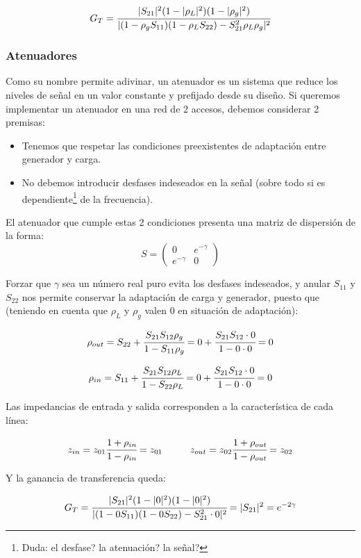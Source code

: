 \documentclass[12pt]{article}
\begin{document}
$$G_T = \cfrac{|S_{21}|^2 (1-|\rho_L|^2) (1-|\rho_g|^2)}{|(1-\rho_g S_{11})(1-\rho_L S_{22}) -S_{21}^2 \rho_L\rho_g|^2}$$

\subsubsection{Atenuadores}

Como su nombre permite adivinar, un atenuador es un sistema que reduce los niveles de se\~nal en un valor constante y prefijado desde su dise\~no. Si queremos implementar un atenuador en una red de 2 accesos, debemos considerar 2 premisas:
\begin{itemize}
	\item Tenemos que respetar las condiciones preexistentes de adaptaci\'on entre generador y carga.
	\item No debemos introducir desfases indeseados en la se\~nal (sobre todo si es dependiente\footnote{Duda: el desfase? la atenuaci\'on? la se\~nal?} de la frecuencia).
\end{itemize}

El atenuador que cumple estas 2 condiciones presenta una matriz de dispersi\'on de la forma:
$$S =\left(\begin{array}{cc}
	0 & e^{-\gamma}\\
	e^{-\gamma} & 0
\end{array}\right)$$

Forzar que $\gamma$ sea un n\'umero real puro evita los desfases indeseados, y anular $S_{11}$ y $S_{22}$ nos permite conservar la adaptaci\'on de carga y generador, puesto que (teniendo en cuenta que $\rho_L$ y $\rho_g$ valen 0 en situaci\'on de adaptaci\'on):

$$\rho_{out} = S_{22} + \cfrac{S_{21}S_{12}\rho_g}{1 - S_{11}\rho_g} = 0 + \cfrac{S_{21}S_{12}\cdot 0}{1 - 0\cdot0} = 0$$

$$\rho_{in} = S_{11} + \cfrac{S_{21}S_{12}\rho_L}{1 - S_{22}\rho_L} = 0 + \cfrac{S_{21}S_{12}\cdot 0}{1 - 0\cdot0} = 0$$

Las impedancias de entrada y salida corresponden a la caracter\'istica de cada l\'inea:

$$z_{in} = z_{01}\cfrac{1+\rho_{in}}{1-\rho_{in}} = z_{01} \hspace{1cm} z_{out} = z_{02}\cfrac{1+\rho_{out}}{1-\rho_{out}} = z_{02}$$

Y la ganancia de transferencia queda:

$$G_T = \cfrac{|S_{21}|^2 (1-|0|^2) (1-|0|^2)}{|(1-0 S_{11})(1-0 S_{22}) -S_{21}^2 \cdot 0|^2} = |S_{21}|^2 = e^{-2\gamma}$$
\end{document}
